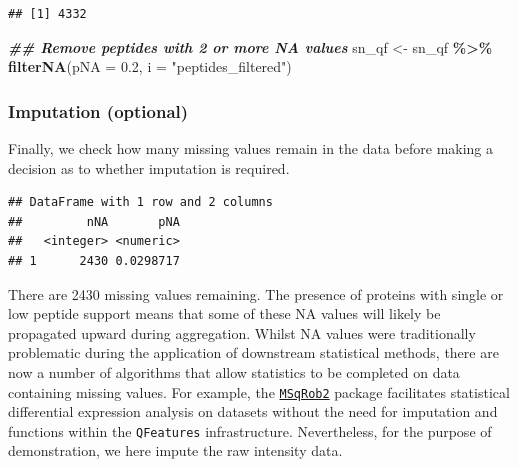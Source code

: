 \documentclass[9pt,a4paper,]{extarticle}
\newenvironment{Shaded}{\begin{snugshade}}{\end{snugshade}}
\newcommand{\AttributeTok}[1]{\textcolor[rgb]{0.13,0.29,0.53}{#1}}
\newcommand{\DocumentationTok}[1]{\textcolor[rgb]{0.56,0.35,0.01}{\textbf{\textit{#1}}}}
\newcommand{\FloatTok}[1]{\textcolor[rgb]{0.00,0.00,0.81}{#1}}
\newcommand{\FunctionTok}[1]{\textcolor[rgb]{0.13,0.29,0.53}{\textbf{#1}}}
\newcommand{\NormalTok}[1]{#1}
\newcommand{\OtherTok}[1]{\textcolor[rgb]{0.56,0.35,0.01}{#1}}
\newcommand{\SpecialCharTok}[1]{\textcolor[rgb]{0.81,0.36,0.00}{\textbf{#1}}}
\newcommand{\StringTok}[1]{\textcolor[rgb]{0.31,0.60,0.02}{#1}}
\begin{document}
\begin{verbatim}
## [1] 4332
\end{verbatim}

\begin{Shaded}
\begin{Highlighting}[]
\DocumentationTok{\#\# Remove peptides with 2 or more NA values}
\NormalTok{sn\_qf }\OtherTok{\textless{}{-}}\NormalTok{ sn\_qf }\SpecialCharTok{\%\textgreater{}\%}
  \FunctionTok{filterNA}\NormalTok{(}\AttributeTok{pNA =} \FloatTok{0.2}\NormalTok{,}
           \AttributeTok{i =} \StringTok{"peptides\_filtered"}\NormalTok{)}
\end{Highlighting}
\end{Shaded}

\subsubsection{Imputation (optional)}\label{imputation-optional-1}

Finally, we check how many missing values remain in the data before making a
decision as to whether imputation is required.

\begin{Shaded}
\end{Shaded}

\begin{verbatim}
## DataFrame with 1 row and 2 columns
##         nNA       pNA
##   <integer> <numeric>
## 1      2430 0.0298717
\end{verbatim}

There are 2430 missing values remaining.
The presence of proteins with single or low peptide support means that some of
these NA values will likely be propagated upward during aggregation. Whilst NA
values were traditionally problematic during the application of downstream
statistical methods, there are now a number of algorithms that allow statistics
to be completed on data containing missing values. For example, the
\href{https://www.bioconductor.org/packages/release/bioc/html/msqrob2.html}{\texttt{MSqRob2}}
\citep{Sticker2020, Goeminne2020, Goeminne2016} package facilitates statistical
differential expression analysis on datasets without the need for imputation and
functions within the \texttt{QFeatures} infrastructure. Nevertheless, for the purpose of
demonstration, we here impute the raw intensity data.
\end{document}
